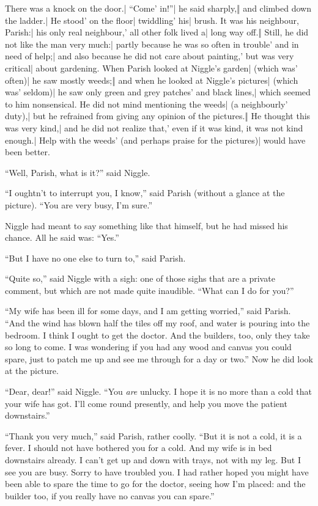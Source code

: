 \begin{itemize}
\halfone There was a knock on the door.| “Come' in!”| he said sharply,‖ and climbed down the ladder.| He stood' on the floor| twiddling' his| brush.
\halftwo It was his neighbour, Parish:| his only real neighbour,' all other folk lived a| long way off.‖ Still, he did not like the man very much:| partly because he was so often in trouble' and in need of help;| and also because he did not care about painting,' but was very critical| about gardening.
\halfone When Parish looked at Niggle’s garden| (which was' often)| he saw mostly weeds;‖ and when he looked at Niggle’s pictures| (which was' seldom)| he saw only green and grey patches' and black lines,| which seemed to him nonsensical.
\halftwo He did not mind mentioning the weeds| (a neighbourly' duty),| but he refrained from giving any opinion of the pictures.‖ He thought this was very kind,| and he did not realize that,' even if it was kind, it was not kind enough.| Help with the weeds' (and perhaps praise for the pictures)| would have been better.
\end{itemize}

\onlyscore{\pagebreak}
“Well, Parish, what is it?” said Niggle.

“I oughtn’t to interrupt you, I know,” said Parish (without a glance at the picture). “You are very busy, I’m sure.”

Niggle had meant to say something like that himself, but he had missed his chance. All he said was: “Yes.”

“But I have no one else to turn to,” said Parish.

“Quite so,” said Niggle with a sigh: one of those sighs that are a private comment, but which are not made quite inaudible. “What can I do for you?”

“My wife has been ill for some days, and I am getting worried,” said Parish. “And the wind has blown half the tiles off my roof, and water is pouring into the bedroom. I think I ought to get the doctor. And the builders, too, only they take so long to come. I was wondering if you had any wood and canvas you could spare, just to patch me up and see me through for a day or two.” Now he did look at the picture.

“Dear, dear!” said Niggle. “You \emph{are} unlucky. I hope it is no more than a cold that your wife has got. I’ll come round presently, and help you move the patient downstairs.”

“Thank you very much,” said Parish, rather coolly. “But it is not a cold, it is a fever. I should not have bothered you for a cold. And my wife is in bed downstairs already. I can’t get up and down with trays, not with my leg. But I see you are busy. Sorry to have troubled you. I had rather hoped you might have been able to spare the time to go for the doctor, seeing how I’m placed: and the builder too, if you really have no canvas you can spare.”

